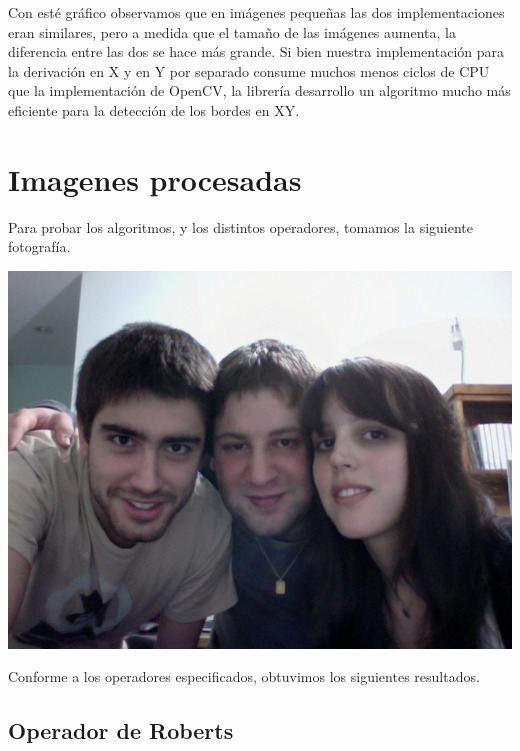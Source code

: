 \documentclass[a4paper, 10pt]{article}
\begin{document}
Con est\'e gr\'afico observamos que en im\'agenes peque\~nas las dos implementaciones eran similares, pero a medida que el tama\~no de las im\'agenes aumenta, la diferencia entre las dos se hace m\'as grande.
Si bien nuestra implementaci\'on para la derivaci\'on en X y en Y por separado consume muchos menos ciclos de CPU que la implementaci\'on de OpenCV, la librer\'ia desarrollo un algoritmo mucho m\'as eficiente para la detecci\'on de los bordes en XY.

\newpage

\section{Imagenes procesadas}

Para probar los algoritmos, y los distintos operadores, tomamos la siguiente fotograf\'ia.

\begin{center}
	\includegraphics[scale=0.30]{Graficos/out/foto3.jpg}
\end{center}

Conforme a los operadores especificados, obtuvimos los siguientes resultados.

\subsection{Operador de Roberts}
\end{document}
